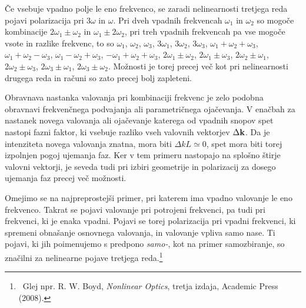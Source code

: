 Če vsebuje vpadno polje le eno frekvenco, se zaradi nelinearnosti tretjega
reda pojavi polarizacija pri 3$\omega$ in $\omega$. Pri dveh vpadnih
frekvencah $\omega_{1}$ in $\omega_{2}$ so mogoče kombinacije $2\omega_{1}\pm\omega_{2}$
in $\omega_{1}\pm2\omega_{2}$, pri treh vpadnih frekvencah pa vse
mogoče vsote in razlike frekvenc, to so $\omega_1$, $\omega_2$, $\omega_3$, 
$3\omega_1$, $3 \omega_2$, $3\omega_3$, 
$\omega_1 + \omega_2 + \omega_3$, $\omega_1 + \omega_2 - \omega_3$, 
$\omega_1 - \omega_2 + \omega_3$, $- \omega_1 + \omega_2 + \omega_3$, 
$2 \omega_1\pm\omega_2$, $2 \omega_1\pm\omega_3$, $2 \omega_2\pm\omega_1$,
$2 \omega_2\pm\omega_3$, $2 \omega_3\pm\omega_1$, $2 \omega_3\pm\omega_2$.
Možnosti je torej precej več kot pri nelinearnosti drugega reda in računi so zato 
precej bolj zapleteni.

Obravnava nastanka valovanja pri
kombinaciji frekvenc je zelo podobna obravnavi frekvenčnega podvajanja ali  parametričnega
ojačevanja. V enačbah za nastanek novega valovanja ali ojačevanje
katerega od vpadnih snopov spet nastopi fazni faktor, ki vsebuje razliko
vseh valovnih vektorjev $\Delta{\bf k}$. Da je intenziteta novega
valovanja znatna, mora biti $\Delta kL\simeq0$, spet mora biti torej
izpolnjen pogoj ujemanja faz. Ker v tem primeru nastopajo na splošno štirje
valovni vektorji, je seveda tudi pri izbiri geometrije in polarizacij
za dosego ujemanja faz precej več možnosti.

Omejimo se na najpreprostejši primer, pri katerem ima vpadno valovanje le eno 
frekvenco. Takrat se pojavi valovanje pri potrojeni frekvenci, pa tudi
pri frekvenci, ki je enaka vpadni. Pojavi se torej polarizacija pri 
vpadni frekvenci, ki spremeni obnašanje osnovnega valovanja, in valovanje vpliva samo nase.
Ti pojavi, ki jih poimenujemo s predpono {\it samo-}, kot na primer samozbiranje, so
značilni za nelinearne pojave tretjega reda.\footnote{~Glej 
npr. R. W. Boyd, {\it Nonlinear Optics}, tretja izdaja, Academic Press (2008).}

